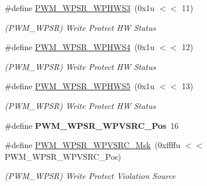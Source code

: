 \begin{DoxyCompactItemize}
\mbox{\label{group__SAMS70__PWM_gae30c95e1f9f0698094737ff0d0148ae0}} 
\#define \mbox{\hyperlink{group__SAMS70__PWM_gae30c95e1f9f0698094737ff0d0148ae0}{P\+W\+M\+\_\+\+W\+P\+S\+R\+\_\+\+W\+P\+H\+W\+S3}}~(0x1u $<$$<$ 11)
\begin{DoxyCompactList}\small\item\em (P\+W\+M\+\_\+\+W\+P\+SR) Write Protect HW Status \end{DoxyCompactList}\item 
\mbox{\label{group__SAMS70__PWM_ga70f5378f620fbaebd02aedb7ef54c5fb}} 
\#define \mbox{\hyperlink{group__SAMS70__PWM_ga70f5378f620fbaebd02aedb7ef54c5fb}{P\+W\+M\+\_\+\+W\+P\+S\+R\+\_\+\+W\+P\+H\+W\+S4}}~(0x1u $<$$<$ 12)
\begin{DoxyCompactList}\small\item\em (P\+W\+M\+\_\+\+W\+P\+SR) Write Protect HW Status \end{DoxyCompactList}\item 
\mbox{\label{group__SAMS70__PWM_ga3b73f74236c8fefeb78205a385c9a895}} 
\#define \mbox{\hyperlink{group__SAMS70__PWM_ga3b73f74236c8fefeb78205a385c9a895}{P\+W\+M\+\_\+\+W\+P\+S\+R\+\_\+\+W\+P\+H\+W\+S5}}~(0x1u $<$$<$ 13)
\begin{DoxyCompactList}\small\item\em (P\+W\+M\+\_\+\+W\+P\+SR) Write Protect HW Status \end{DoxyCompactList}\item 
\mbox{\label{group__SAMS70__PWM_ga0094684a5f44b6b03640baa9fdc6135f}} 
\#define {\bfseries P\+W\+M\+\_\+\+W\+P\+S\+R\+\_\+\+W\+P\+V\+S\+R\+C\+\_\+\+Pos}~16
\item 
\mbox{\label{group__SAMS70__PWM_gac48a1ab59a4e311dbdd1abba533a1ef2}} 
\#define \mbox{\hyperlink{group__SAMS70__PWM_gac48a1ab59a4e311dbdd1abba533a1ef2}{P\+W\+M\+\_\+\+W\+P\+S\+R\+\_\+\+W\+P\+V\+S\+R\+C\+\_\+\+Msk}}~(0xffffu $<$$<$ P\+W\+M\+\_\+\+W\+P\+S\+R\+\_\+\+W\+P\+V\+S\+R\+C\+\_\+\+Pos)
\begin{DoxyCompactList}\small\item\em (P\+W\+M\+\_\+\+W\+P\+SR) Write Protect Violation Source \end{DoxyCompactList}\item 
\mbox{\label{group__SAMS70__PWM_ga4299c4528ffdef7d23c13e1e9a975bee}} 

\end{DoxyCompactItemize}
